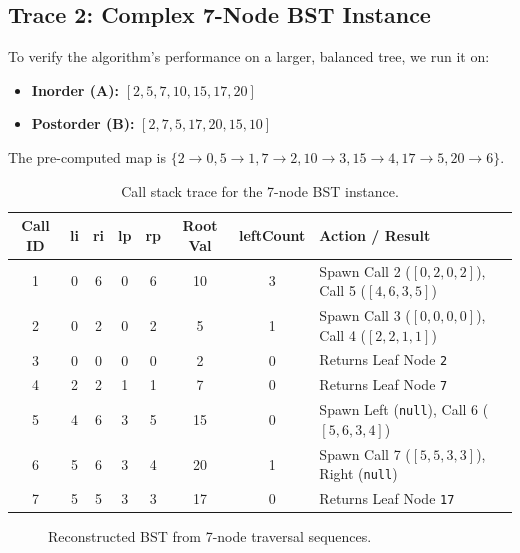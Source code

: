 \documentclass[10pt,journal,compsoc,onecolumn]{IEEEtran}
\begin{document}
\subsection{Trace 2: Complex 7-Node BST Instance}
To verify the algorithm's performance on a larger, balanced tree, we run it on:
\begin{itemize}
    \item \textbf{Inorder (A):} $[2, 5, 7, 10, 15, 17, 20]$
    \item \textbf{Postorder (B):} $[2, 7, 5, 17, 20, 15, 10]$
\end{itemize}

The pre-computed map is $\{2 \to 0, 5 \to 1, 7 \to 2, 10 \to 3, 15 \to 4, 17 \to 5, 20 \to 6\}$.

\begin{table}[htbp]
\centering
\begin{tabular}{cccccccl}
\toprule
\textbf{Call ID} & \textbf{li} & \textbf{ri} & \textbf{lp} & \textbf{rp} & \textbf{Root Val} & \textbf{leftCount} & \textbf{Action / Result} \\
\midrule
1 & 0 & 6 & 0 & 6 & 10 & 3 & Spawn Call 2 ($[0,2,0,2]$), Call 5 ($[4,6,3,5]$) \\
2 & 0 & 2 & 0 & 2 & 5 & 1 & Spawn Call 3 ($[0,0,0,0]$), Call 4 ($[2,2,1,1]$) \\
3 & 0 & 0 & 0 & 0 & 2 & 0 & Returns Leaf Node \texttt{2} \\
4 & 2 & 2 & 1 & 1 & 7 & 0 & Returns Leaf Node \texttt{7} \\
5 & 4 & 6 & 3 & 5 & 15 & 0 & Spawn Left (\texttt{null}), Call 6 ($[5,6,3,4]$) \\
6 & 5 & 6 & 3 & 4 & 20 & 1 & Spawn Call 7 ($[5,5,3,3]$), Right (\texttt{null}) \\
7 & 5 & 5 & 3 & 3 & 17 & 0 & Returns Leaf Node \texttt{17} \\
\bottomrule
\end{tabular}
\caption{Call stack trace for the 7-node BST instance.}
\label{tab:trace2}
\end{table}

\begin{figure}[htbp]
\centering
{}
\caption{Reconstructed BST from 7-node traversal sequences.}
\label{fig:tree2}
\end{figure}
\end{document}

